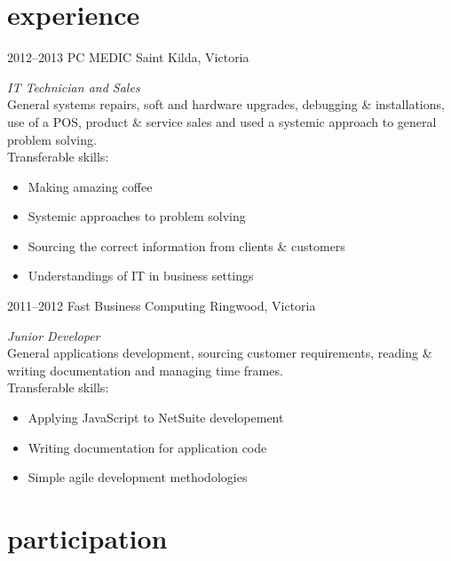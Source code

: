 \documentclass[]{friggeri-cv} %
\begin{document}
\section{experience}

\begin{entrylist}
\entry
{2012--2013}
{PC MEDIC}
{Saint Kilda, Victoria}
{\emph{IT Technician and Sales} \\
General systems repairs, soft and hardware upgrades, debugging \& installations, use of a POS, product \& service sales and used a systemic approach to general problem solving. \\
Transferable skills:
\begin{itemize}
    \item Making amazing coffee
    \item Systemic approaches to problem solving
    \item Sourcing the correct information from clients \& customers
    \item Understandings of IT in business settings
\end{itemize}}
\entry
{2011--2012}
{Fast Business Computing}
{Ringwood, Victoria}
{\emph{Junior Developer} \\
General applications development, sourcing customer requirements, reading \& writing documentation and managing time frames. \\
Transferable skills:
\begin{itemize}
    \item Applying JavaScript to NetSuite developement
    \item Writing documentation for application code
    \item Simple agile development methodologies
\end{itemize}
}
\end{entrylist}


\section{participation}
\end{document}
